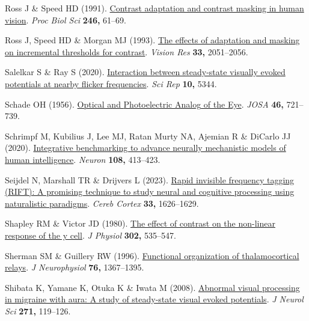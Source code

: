\documentclass[
  letterpaper,
  DIV=11,
  numbers=noendperiod]{scrartcl}
\newlength{\cslhangindent}
\newenvironment{CSLReferences}[2] %
 {\begin{list}{}{%
  \setlength{\itemindent}{0pt}
  \setlength{\leftmargin}{0pt}
  \setlength{\parsep}{0pt}
  \ifodd #1
   \setlength{\leftmargin}{\cslhangindent}
   \setlength{\itemindent}{-1\cslhangindent}
  \fi
  \setlength{\itemsep}{#2\baselineskip}}}
 {\end{list}}
\begin{document}
\begin{CSLReferences}{1}{1}
Ross J \& Speed HD (1991).
\href{https://doi.org/10.1098/rspb.1991.0125}{Contrast adaptation and
contrast masking in human vision}. \emph{Proc Biol Sci} \textbf{246,}
61--69.

Ross J, Speed HD \& Morgan MJ (1993).
\href{https://doi.org/10.1016/0042-6989(93)90003-f}{The effects of
adaptation and masking on incremental thresholds for contrast}.
\emph{Vision Res} \textbf{33,} 2051--2056.

Salelkar S \& Ray S (2020).
\href{https://doi.org/10.1038/s41598-020-62180-y}{Interaction between
steady-state visually evoked potentials at nearby flicker frequencies}.
\emph{Sci Rep} \textbf{10,} 5344.

Schade OH (1956). \href{https://doi.org/10.1364/JOSA.46.000721}{Optical
and {Photoelectric Analog} of the {Eye}}. \emph{JOSA} \textbf{46,}
721--739.

Schrimpf M, Kubilius J, Lee MJ, Ratan Murty NA, Ajemian R \& DiCarlo JJ
(2020). \href{https://doi.org/10.1016/j.neuron.2020.07.040}{Integrative
benchmarking to advance neurally mechanistic models of human
intelligence}. \emph{Neuron} \textbf{108,} 413--423.

Seijdel N, Marshall TR \& Drijvers L (2023).
\href{https://doi.org/10.1093/cercor/bhac160}{Rapid invisible frequency
tagging (RIFT): A promising technique to study neural and cognitive
processing using naturalistic paradigms}. \emph{Cereb Cortex}
\textbf{33,} 1626--1629.

Shapley RM \& Victor JD (1980).
\href{https://doi.org/10.1113/jphysiol.1980.sp013259}{The effect of
contrast on the non-linear response of the y cell}. \emph{J Physiol}
\textbf{302,} 535--547.

Sherman SM \& Guillery RW (1996).
\href{https://doi.org/10.1152/jn.1996.76.3.1367}{Functional organization
of thalamocortical relays}. \emph{J Neurophysiol} \textbf{76,}
1367--1395.

Shibata K, Yamane K, Otuka K \& Iwata M (2008).
\href{https://doi.org/10.1016/j.jns.2008.04.004}{Abnormal visual
processing in migraine with aura: A study of steady-state visual evoked
potentials}. \emph{J Neurol Sci} \textbf{271,} 119--126.


\end{CSLReferences}
\end{document}
